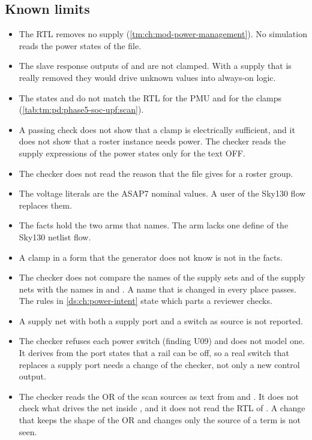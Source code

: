 \subsection{Known limits}
\begin{itemize}
  \item The RTL removes no supply (\cref{tm:ch:mod-power-management}). No simulation reads the power states of the file.
  \item The slave response outputs of  and  are not clamped. With a supply that is really removed they would drive unknown values into always-on logic.
  \item The states  and  do not match the RTL for the PMU and for the clamps (\cref{tab:tm:pd:phase5-soc-upf:scan}).
  \item A passing check does not show that a clamp is electrically sufficient, and it does not show that a roster instance needs power. The checker reads the supply expressions of the power states only for the text OFF.
  \item The checker does not read the reason that the file gives for a roster group.
  \item The voltage literals are the ASAP7 nominal values. A user of the Sky130 flow replaces them.
  \item The facts hold the two arms that  names. The arm  lacks one define of the Sky130 netlist flow.
  \item A clamp in a form that the generator does not know is not in the facts.
  \item The checker does not compare the names of the supply sets and of the supply nets with the names in  and . A name that is changed in every place passes. The rules in \cref{ds:ch:power-intent} state which parts a reviewer checks.
  \item A supply net with both a supply port and a switch as source is not reported.
  \item The checker refuses each power switch (finding U09) and does not model one. It derives from the port states that a rail can be off, so a real switch that replaces a supply port needs a change of the checker, not only a new control output.
  \item The checker reads the OR of the scan sources as text from  and . It does not check what drives the net  inside , and it does not read the RTL of . A change that keeps the shape of the OR and changes only the source of a term is not seen.
\end{itemize}
